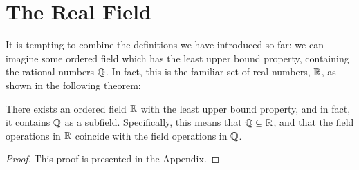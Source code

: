 \section{The Real Field}
It is tempting to combine the definitions we have introduced so far: we can imagine some ordered field which has the least upper bound property, containing the rational numbers $\mathbb{Q}$. In fact, this is the familiar set of real numbers, $\mathbb{R}$, as shown in the following theorem:

\begin{theorem}
There exists an ordered field $\mathbb{R}$ with the least upper bound property, and in fact, it contains $\mathbb{Q}$ as a subfield. Specifically, this means that $\mathbb{Q} \subseteq \mathbb{R}$, and that the field operations in $\mathbb{R}$ coincide with the field operations in $\mathbb{Q}$. 
\begin{proof}
This proof is presented in the Appendix.
\end{proof}
\end{theorem}

